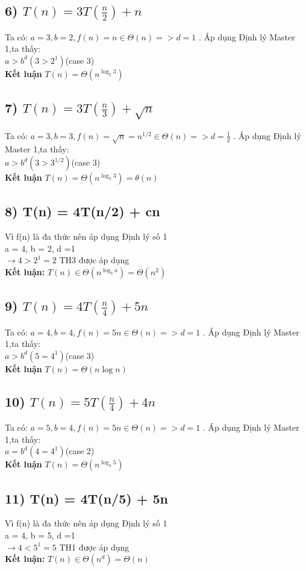 \documentclass[10pt,a4paper]{article}
\begin{document}
\subsection*{6) $T(n) = 3T(\frac{n}{2}) + n$}
Ta có: $a = 3, b = 2 , f(n) = n \in \Theta(n) => d = 1$ . Áp dụng Định lý Master 1,ta thấy:\\
$a > b^d (3>2^1)$(case 3)\\
\textbf{Kết luận} $T(n) = \Theta(n^{\log_2{3}})$
\subsection*{7) $T(n) = 3T(\frac{n}{3}) + \sqrt{n}$}
Ta có: $a = 3, b = 3 , f(n) = \sqrt{n} = n^{1/2} \in \Theta(n) => d = \frac{1}{2}$ . Áp dụng Định lý Master 1,ta thấy:\\
$a > b^d (3>3^{1/2})$(case 3)\\
\textbf{Kết luận} $T(n) = \Theta(n^{\log_3{3}})=\theta(n)$
\subsection*{8) T(n) = 4T(n/2) + cn}
Vì f(n) là đa thức nên áp dụng Định lý số 1\\
a = 4, b = 2, d =1 \\
$\rightarrow 4 > 2^1 = 2$ TH3 được áp dụng\\
\textbf{Kết luận: }$T(n) \in \Theta(n^{\log_b{a}}) = \Theta(n^2)$
\subsection*{9) $T(n) = 4T(\frac{n}{4}) + 5n$}
Ta có: $a = 4, b = 4 , f(n) = 5n \in \Theta(n) => d = 1$ . Áp dụng Định lý Master 1,ta thấy:\\
$a > b^d (5=4^1)$(case 3)\\
\textbf{Kết luận} $T(n) = \Theta(n\log{n})$
\subsection*{10) $T(n) = 5T(\frac{n}{4}) + 4n$}
Ta có: $a = 5, b = 4 , f(n) = 5n \in \Theta(n) => d = 1$ . Áp dụng Định lý Master 1,ta thấy:\\
$a = b^d (4=4^1)$(case 2)\\
\textbf{Kết luận} $T(n) = \Theta(n^{\log_4{5}})$\\
\subsection*{11) T(n) = 4T(n/5) + 5n}
Vì f(n) là đa thức nên áp dụng Định lý số 1\\
a = 4, b = 5, d =1 \\
$\rightarrow 4 < 5^1 = 5$ TH1 được áp dụng\\
\textbf{Kết luận: }$T(n) \in \Theta(n^d) = \Theta(n)$
\end{document}

